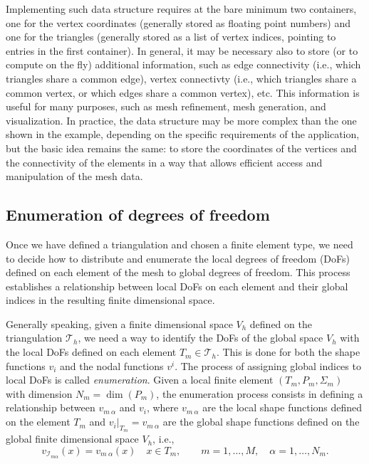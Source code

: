 Implementing such data structure requires at the bare minimum two containers,
one for the vertex coordinates (generally stored as floating point numbers) and
one for the triangles (generally stored as a list of vertex indices, pointing to
entries in the first container). In general, it may be necessary also to store
(or to compute on the fly) additional information, such as edge connectivity
(i.e., which triangles share a common edge), vertex connectivty (i.e., which
triangles share a common vertex, or which edges share a common vertex), etc.
This information is useful for many purposes, such as mesh refinement, mesh
generation, and visualization. In practice, the data structure may be more
complex than the one shown in the example, depending on the specific
requirements of the application, but the basic idea remains the same: to store
the coordinates of the vertices and the connectivity of the elements in a way
that allows efficient access and manipulation of the mesh data.

\subsection{Enumeration of degrees of freedom}

Once we have defined a triangulation and chosen a finite element type, we need to decide how to distribute and enumerate the local degrees of freedom (DoFs) defined on each element of the mesh to global degrees of freedom. This process establishes a relationship between local DoFs on each element and their global indices in the resulting finite dimensional space.

Generally speaking, given a finite dimensional space $V_h$ defined on the triangulation $\mathcal{T}_h$, we need a way to identify the DoFs of the global space $V_h$ with the local DoFs defined on each element $T_m \in \mathcal{T}_h$. This is done for both the shape functions $v_i$ and the nodal functions $v^i$. The process of assigning global indices to local DoFs is called \emph{enumeration}. Given a local finite element $(T_m, P_m, \Sigma_m)$ with dimension $N_m = \dim(P_m)$, the enumeration process consists in defining a relationship between $v_{m~\alpha}$ and $v_{i}$, where $v_{m~\alpha}$ are the local shape functions defined on the element $T_m$ and $v_{i}|_{T_m} = v_{m~\alpha}$ are the global shape functions defined on the global finite dimensional space $V_h$, i.e., 
\[
  v_{\mathcal{I}_{m\alpha}}(x) = v_{m~\alpha}(x) \quad x \in T_m, \qquad m = 1,\ldots,M, \quad \alpha = 1,\ldots,N_m.
\]

